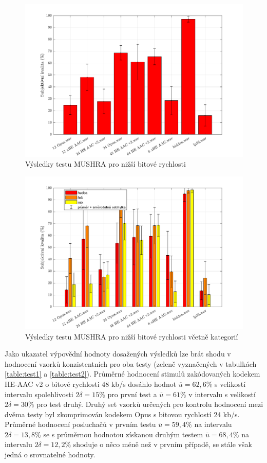 \begin{figure}[h!]
    \centering
    \includegraphics[width = 1\textwidth]{pic/mushra2Mean.pdf}
    \caption{Výsledky testu MUSHRA pro nižší bitové rychlosti}
    \label{pic:mushra2}
\end{figure}

\begin{figure}[h!]
    \centering
    \includegraphics[width = 1\textwidth]{pic/mushra2.pdf}
    \caption{Výsledky testu MUSHRA pro nižší bitové rychlosti včetně kategorií}
    \label{pic:mushra2:kat}
\end{figure}

Jako ukazatel výpovědní hodnoty dosažených výsledků lze brát shodu v hodnocení vzorků konzistentních pro oba testy (zeleně vyznačených v tabulkách \ref{table:test1} a \ref{table:test2}). Průměrné hodnocení stimulů zakódovaných kodekem HE-AAC v2 o bitové rychlosti 48 kb/s dosáhlo hodnot $\overline{u} = 62,6 \%$ s velikostí intervalu spolehlivosti $2\delta = 15 \%$ pro první test a $\overline{u} = 61 \%$ v intervalu s velikostí $2\delta = 30 \%$ pro test druhý. Druhý set vzorků určených pro kontrolu hodnocení mezi dvěma testy byl zkomprimován kodekem Opus s bitovou rychlostí 24 kb/s. Průměrné hodnocení posluchačů v prvním testu $\overline{u} = 59,4 \%$ na intervalu $2\delta = 13,8 \%$ se s průměrnou hodnotou získanou druhým testem $\overline{u} = 68,4 \%$ na intervalu $2\delta = 12,2 \%$ shoduje o něco méně než v prvním případě, se stále však jedná o srovnatelné hodnoty.

